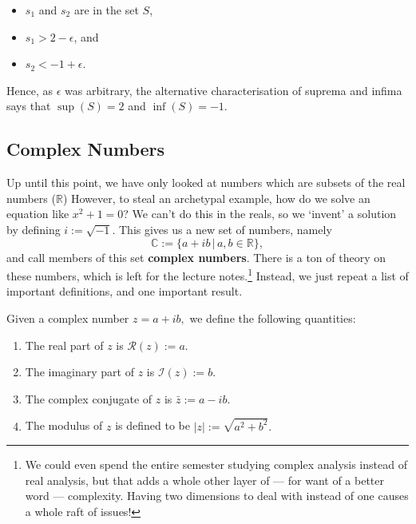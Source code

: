 \documentclass[
  17pt,
  a4paper]{extarticle}
\providecommand{\tightlist}{%
  \setlength{\itemsep}{0pt}\setlength{\parskip}{0pt}}
\theoremstyle{plain}
\theoremstyle{definition}
\theoremstyle{plain}
\theoremstyle{plain}
\theoremstyle{plain}
\theoremstyle{plain}
\theoremstyle{definition}
\theoremstyle{definition}
\theoremstyle{remark}
\theoremstyle{remark}
\let\BeginKnitrBlock\begin \let\EndKnitrBlock\end
\renewcommand{\;}{\,}
\begin{document}
\begin{itemize}
\tightlist
\item
  \(s_1\) and \(s_2\) are in the set \(S\),
\item
  \(s_1 > 2 - \epsilon\), and
\item
  \(s_2 < -1 + \epsilon\).
\end{itemize}

Hence, as \(\epsilon\) was arbitrary, the alternative characterisation of suprema and infima says that \(\sup(S) = 2\) and \(\inf(S) = -1\).

\hypertarget{complex-numbers}{%
\subsection{Complex Numbers}\label{complex-numbers}}

Up until this point, we have only looked at numbers which are subsets of the real numbers (\(\mathbb{R}\)) However, to steal an archetypal example, how do we solve an equation like \(x^2 + 1 = 0\)? We can't do this in the reals, so we `invent' a solution by defining \(i:=\sqrt{-1}.\) This gives us a new set of numbers, namely \[\mathbb{C}:= \lbrace a + ib \;\lvert\; a,b\in\mathbb{R}\rbrace,\] and call members of this set \textbf{complex numbers}. There is a ton of theory on these numbers, which is left for the lecture notes.\footnote{We could even spend the entire semester studying complex analysis instead of real analysis, but that adds a whole other layer of --- for want of a better word --- complexity. Having two dimensions to deal with instead of one causes a whole raft of issues!} Instead, we just repeat a list of important definitions, and one important result.

\BeginKnitrBlock{definition}[Complex Numbers]
{\label{def:def0} }Given a complex number \(z = a + ib,\) we define the following quantities:

\begin{enumerate}
\def\labelenumi{\roman{enumi})}
\tightlist
\item
  The real part of \(z\) is \(\mathcal{R}(z) := a.\)
\item
  The imaginary part of \(z\) is \(\mathcal{I}(z) := b.\)
\item
  The complex conjugate of \(z\) is \(\bar{z}:= a - ib.\)
\item
  The modulus of \(z\) is defined to be \(\lvert z \rvert := \sqrt{a^2 + b^2}.\)
\end{enumerate}
\EndKnitrBlock{definition}
\end{document}
